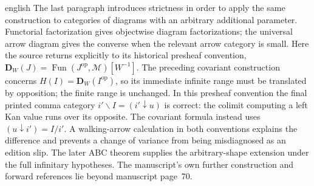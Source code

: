 \begin{otherlanguage*}{english}
The last paragraph introduces strictness in order to apply the same construction to categories of diagrams with an arbitrary additional parameter. Functorial factorization gives objectwise diagram factorizations; the universal arrow diagram gives the converse when the relevant arrow category is small. Here the source returns explicitly to its historical presheaf convention, $\mathbf D_W(J)=\operatorname{Fun}(J^{\mathrm{op}},\mathcal M)[W^{-1}]$. The preceding covariant construction concerns $H(I)=\mathbf D_W(I^{\mathrm{op}})$, so its immediate infinite range must be translated by opposition; the finite range is unchanged. In this presheaf convention the final printed comma category $i'\backslash I=(i'\downarrow u)$ is correct: the colimit computing a left Kan value runs over its opposite. The covariant formula instead uses $(u\downarrow i')=I/i'$. A walking-arrow calculation in both conventions explains the difference and prevents a change of variance from being misdiagnosed as an edition slip. The later ABC theorem supplies the arbitrary-shape extension under the full infinitary hypotheses. The manuscript's own further construction and forward references lie beyond manuscript page~70.
\end{otherlanguage*}
